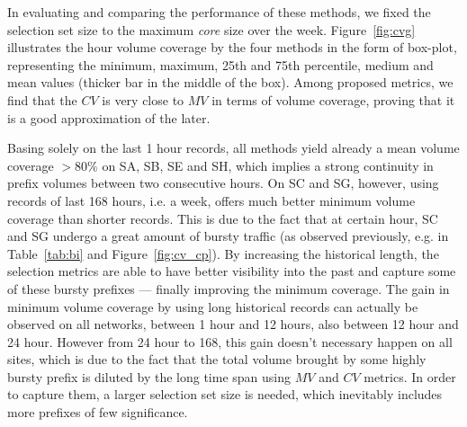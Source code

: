 In evaluating and comparing the performance of these methods, we fixed the selection set size to the maximum \textit{core} size over the week. 
Figure~\ref{fig:cvg} illustrates the hour volume coverage by the four methods in the form of box-plot, representing the minimum, maximum, 25th and 75th percentile, medium and mean values (thicker bar in the middle of the box). 
Among proposed metrics, we find that the $CV$ is very close to $MV$ in terms of volume coverage, proving that it is a good approximation of the later.

Basing solely on the last 1 hour records, all methods yield already a mean volume coverage $>80\%$ on SA, SB, SE and SH, which implies a strong continuity in prefix volumes between two consecutive hours. 
On SC and SG, however, using records of last 168 hours, i.e. a week, offers much better minimum volume coverage than shorter records. This is due to the fact that at certain hour, SC and SG undergo a great amount of bursty traffic (as observed previously, e.g. in Table~\ref{tab:bi} and Figure~\ref{fig:cv_cp}). By increasing the historical length, the selection metrics are able to have better visibility into the past and capture some of these bursty prefixes --- finally improving the minimum coverage.
The gain in minimum volume coverage by using long historical records can actually be observed on all networks, between 1 hour and 12 hours, also between 12 hour and 24 hour. 
However from 24 hour to 168, this gain doesn't necessary happen on all sites, which is due to the fact that the total volume brought by some highly bursty prefix is diluted by the long time span using $MV$ and $CV$ metrics. In order to capture them, a larger selection set size is needed, which inevitably includes more prefixes of few significance.


